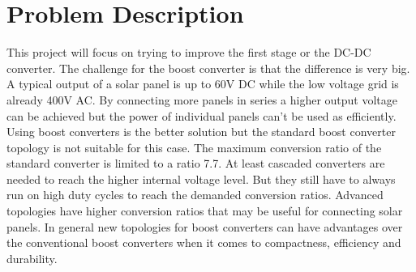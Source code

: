 \section{Problem Description}
This project will focus on trying to improve the first stage or the DC-DC converter. 
The challenge for the boost converter is that the difference is very big.
A typical output of a solar panel is up to 60V DC while the low voltage grid is already 400V AC.
By connecting more panels in series a higher output voltage can be achieved but the power of individual panels can't be used as efficiently.
Using boost converters is the better solution but the standard boost converter topology is not suitable for this case. 
The maximum conversion ratio of the standard converter is limited to a ratio 7.7.
At least cascaded converters are needed to reach the higher internal voltage level.
But they still have to always run on high duty cycles to reach the demanded conversion ratios.
Advanced topologies have higher conversion ratios that may be useful for connecting solar panels.
In general new topologies for boost converters can have advantages over the conventional boost converters when it comes to compactness, efficiency and durability.

 
